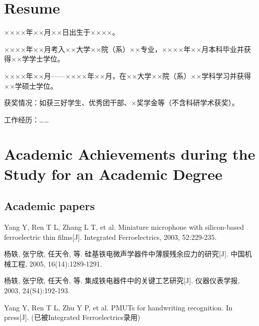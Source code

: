 
\begin{resume}

  \section*{Resume}

  ××××年××月××日出生于××××。

  ××××年××月考入××大学××院（系）××专业，××××年××月本科毕业并获得××学学士学位。

  ××××年××月——××××年××月，在××大学××院（系）××学科学习并获得××学硕士学位。

  获奖情况：如获三好学生、优秀团干部、×奖学金等（不含科研学术获奖）。

  工作经历：……

  \section*{Academic Achievements during the Study for an Academic Degree}

  \subsection{Academic papers}

  \begin{achievements}
    \item Yang Y, Ren T L, Zhang L T, et al. Miniature microphone with silicon-based ferroelectric thin films[J]. Integrated Ferroelectrics, 2003, 52:229-235.
    \item 杨轶, 张宁欣, 任天令, 等. 硅基铁电微声学器件中薄膜残余应力的研究[J]. 中国机械工程, 2005, 16(14):1289-1291.
    \item 杨轶, 张宁欣, 任天令, 等. 集成铁电器件中的关键工艺研究[J]. 仪器仪表学报, 2003, 24(S4):192-193.
    \item Yang Y, Ren T L, Zhu Y P, et al. PMUTs for handwriting recognition. In press[J]. (已被Integrated Ferroelectrics录用)
  \end{achievements}



\end{resume}
